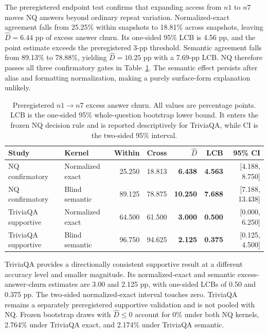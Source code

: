 \documentclass[sigconf,nonacm]{acmart}
\newcommand{\Dhat}{\widehat{D}}
\newcommand{\none}{\ensuremath{n1}}
\newcommand{\nseven}{\ensuremath{n7}}
\begin{document}
The preregistered endpoint test confirms that expanding access from $\none$ to $\nseven$ moves NQ answers beyond ordinary repeat variation. Normalized-exact agreement falls from 25.25\% within snapshots to 18.81\% across snapshots, leaving $\Dhat=6.44$ pp of excess answer churn. Its one-sided 95\% LCB is 4.56 pp, and the point estimate exceeds the preregistered 3-pp threshold. Semantic agreement falls from 89.13\% to 78.88\%, yielding $\Dhat=10.25$ pp with a 7.69-pp LCB. NQ therefore passes all three confirmatory gates in Table~\ref{tab:primary}. The semantic effect persists after alias and formatting normalization, making a purely surface-form explanation unlikely.

\begin{table}[t]
  \caption{Preregistered $\none\rightarrow\nseven$ excess answer churn. All values are percentage points. LCB is the one-sided 95\% whole-question bootstrap lower bound. It enters the frozen NQ decision rule and is reported descriptively for TriviaQA, while CI is the two-sided 95\% interval.}
  \label{tab:primary}
  \small
  \begin{tabular}{llrrrrr}
    \toprule
    \rowcolor{auditheader}
    \textcolor{auditnavy}{\textbf{Study}} & \textcolor{auditnavy}{\textbf{Kernel}} & \textcolor{auditnavy}{\textbf{Within}} & \textcolor{auditnavy}{\textbf{Cross}} & \textcolor{auditnavy}{\textbf{$\Dhat$}} & \textcolor{auditnavy}{\textbf{LCB}} & \textcolor{auditnavy}{\textbf{95\% CI}} \\
    \midrule
    NQ confirmatory & Normalized exact & 25.250 & 18.813 & \textbf{6.438} & \textbf{4.563} & [4.188, 8.750] \\
    \rowcolor{auditstripe}
    NQ confirmatory & Blind semantic & 89.125 & 78.875 & \textbf{10.250} & \textbf{7.688} & [7.188, 13.438] \\
    TriviaQA supportive & Normalized exact & 64.500 & 61.500 & \textbf{3.000} & \textbf{0.500} & [0.000, 6.250] \\
    \rowcolor{auditstripe}
    TriviaQA supportive & Blind semantic & 96.750 & 94.625 & \textbf{2.125} & \textbf{0.375} & [0.125, 4.500] \\
    \bottomrule
  \end{tabular}
\end{table}

TriviaQA provides a directionally consistent supportive result at a different accuracy level and smaller magnitude. Its normalized-exact and semantic excess-answer-churn estimates are 3.00 and 2.125 pp, with one-sided LCBs of 0.50 and 0.375 pp. The two-sided normalized-exact interval touches zero. TriviaQA remains a separately preregistered supportive validation and is not pooled with NQ. Frozen bootstrap draws with $\Dhat\leq0$ account for 0\% under both NQ kernels, 2.764\% under TriviaQA exact, and 2.174\% under TriviaQA semantic.
\end{document}
